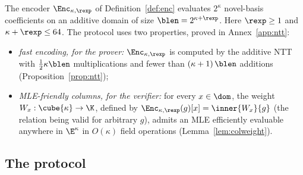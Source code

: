 The encoder $\Enc_{\kappa,\rexp}$ of Definition~\ref{def:enc} evaluates $2^\kappa$ novel-basis coefficients on an additive domain of size $\blen=2^{\kappa+\rexp}$. Here $\rexp\ge1$ and $\kappa+\rexp\le64$. The protocol uses two properties, proved in Annex~\ref{app:ntt}:
\begin{itemize}[itemsep=2pt]
\item \emph{fast encoding, for the prover:} $\Enc_{\kappa,\rexp}$ is computed by the additive NTT with $\tfrac12 \kappa \blen$ multiplications and fewer than $(\kappa + 1)\, \blen$ additions (Proposition~\ref{prop:ntt});
\item \emph{MLE-friendly columns, for the verifier:} for every $x \in \dom$, the weight $W_x : \cube{\kappa} \to \K$, defined by $\Enc_{\kappa,\rexp}(g)[x] = \inner{W_x}{g}$ (the relation being valid for arbitrary $g$), admits an MLE efficiently evaluable anywhere in $\E^{\kappa}$ in $O(\kappa)$ field operations (Lemma~\ref{lem:colweight}).
\end{itemize}

\subsection{The protocol}\label{sec:protocol}

